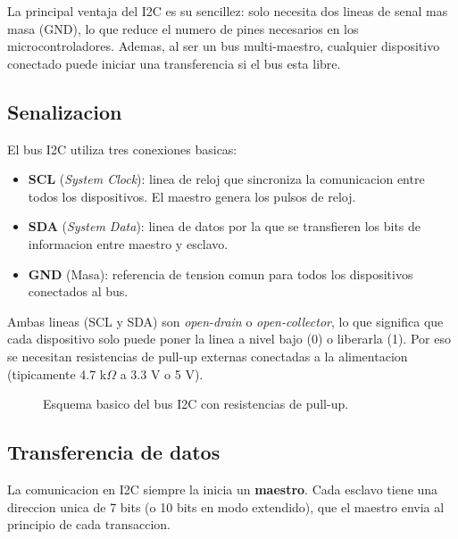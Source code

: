 La principal ventaja del I2C es su sencillez: solo necesita dos lineas de senal
mas masa (GND), lo que reduce el numero de pines necesarios en los
microcontroladores. Ademas, al ser un bus multi-maestro, cualquier dispositivo
conectado puede iniciar una transferencia si el bus esta libre.

\subsection{Senalizacion}

El bus I2C utiliza tres conexiones basicas:

\begin{itemize}
    \item \textbf{SCL} (\textit{System Clock}): linea de reloj que sincroniza la
    comunicacion entre todos los dispositivos. El maestro genera los pulsos de
    reloj.
    \item \textbf{SDA} (\textit{System Data}): linea de datos por la que se
    transfieren los bits de informacion entre maestro y esclavo.
    \item \textbf{GND} (Masa): referencia de tension comun para todos los
    dispositivos conectados al bus.
\end{itemize}

Ambas lineas (SCL y SDA) son \textit{open-drain} o \textit{open-collector}, lo que
significa que cada dispositivo solo puede poner la linea a nivel bajo (0) o
liberarla (1). Por eso se necesitan resistencias de pull-up externas
conectadas a la alimentacion (tipicamente 4.7 k$\Omega$ a 3.3 V o 5 V).

\begin{figure}[H]
    \centering
    \caption{Esquema basico del bus I2C con resistencias de pull-up.}
    \label{fig:i2c_esquema}
\end{figure}

\subsection{Transferencia de datos}

La comunicacion en I2C siempre la inicia un \textbf{maestro}. Cada esclavo tiene
una direccion unica de 7 bits (o 10 bits en modo extendido), que el maestro
envia al principio de cada transaccion.

